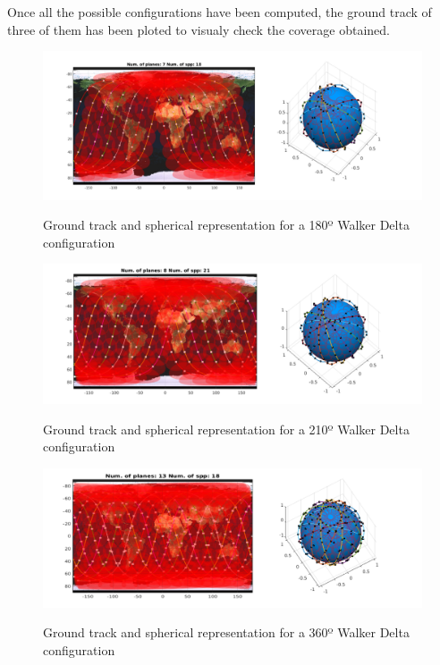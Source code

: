 Once all the possible configurations have been computed, the ground track of three of them  has been ploted to visualy check the coverage obtained. 

\begin{figure}%
	\centering
	\includegraphics[width=1\textwidth]{./testing/WB180.png}\\
	\caption{Ground track and spherical representation for a 180º Walker Delta configuration}
	\label{fig:graph120}
\end{figure}

\begin{figure}%
	\centering
	\includegraphics[width=1\textwidth]{./testing/WB210.png}\\
	\caption{Ground track and spherical representation for a 210º Walker Delta configuration}
	\label{fig:graph120}
\end{figure}

\begin{figure}%
	\centering
	\includegraphics[width=1\textwidth]{./testing/WB360.png}\\
	\caption{Ground track and spherical representation for a 360º Walker Delta configuration}
	\label{fig:graph120}
\end{figure}

